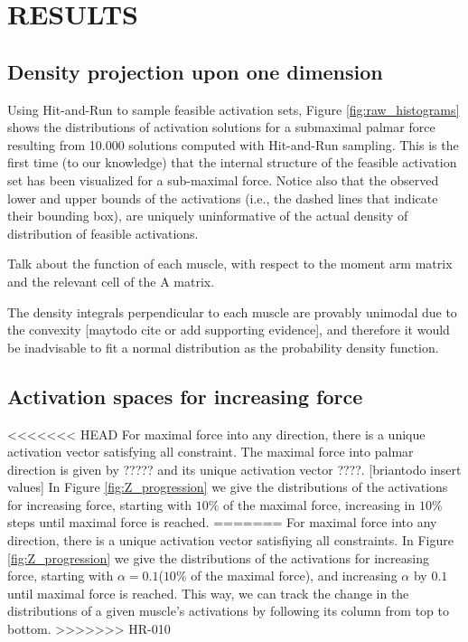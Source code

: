 

\section{RESULTS}
\subsection{Density projection upon one dimension} %
\label{ssub:density_projection_upon_one_dimension}


Using Hit-and-Run to sample feasible activation sets, Figure \ref{fig:raw_histograms} shows the distributions of activation solutions for a submaximal palmar force resulting from 10.000 solutions computed with Hit-and-Run sampling.
This is the first time (to our knowledge) that the internal structure of the feasible activation set has been visualized for a sub-maximal force.
Notice also that the observed lower and upper bounds of the activations (i.e., the dashed lines that indicate their bounding box), are uniquely uninformative of the actual density of distribution of feasible activations.

Talk about the function of each muscle, with respect to the moment arm matrix and the relevant cell of the A matrix.

The density integrals perpendicular to each muscle are provably unimodal due to the convexity [maytodo cite or add supporting evidence], and therefore it would be inadvisable to fit a normal distribution as the probability density function.

\subsection{Activation spaces for increasing force} %
\label{sub:activation_spaces_for_increasing_force}
<<<<<<< HEAD
For maximal force into any direction, there is a unique activation vector satisfying all constraint. The maximal force into palmar direction is given by ????? and its unique activation vector ????. [briantodo insert values]
In Figure \ref{fig:Z_progression} we give the distributions of the activations for increasing force, starting with $10\%$ of the maximal force, increasing in $10\%$ steps until maximal force is reached.
=======
For maximal force into any direction, there is a unique activation vector satisfiying all constraints.
In Figure \ref{fig:Z_progression} we give the distributions of the activations for increasing force, starting with $\alpha=0.1$($10\%$ of the maximal force), and increasing $\alpha$ by $0.1$ until maximal force is reached.
This way, we can track the change in the distributions of a given muscle's activations by following its column from top to bottom.
>>>>>>> HR-010

